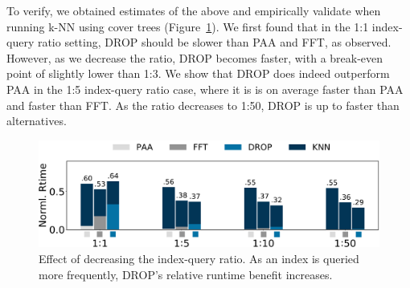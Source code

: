 To verify, we obtained estimates of the above and empirically validate when running k-NN using cover trees (Figure~\ref{fig:query}).
We first found that in the 1:1 index-query ratio setting, DROP should be slower than PAA and FFT, as observed. 
However, as we decrease the ratio, DROP becomes faster, with a break-even point of slightly lower than 1:3. 
We show that DROP does indeed outperform PAA  in the 1:5 index-query ratio case, where it is is on average \red{$1.51\times$} faster than PAA and \red{$1.03\times$} faster than FFT. 
As the ratio decreases to 1:50, DROP is up to \red{$1.9\times$} faster than alternatives.  


\begin{figure}
\includegraphics[width=\linewidth]{figs/query-rev.pdf}
\caption[]{Effect of decreasing the index-query ratio. As an index is queried more frequently, DROP's relative runtime benefit  increases.}
\label{fig:query}
\end{figure}

